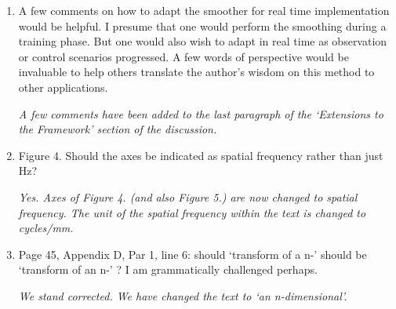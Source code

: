 \documentclass{article}
\begin{document}
\begin{enumerate}
\item A few comments on how to adapt the smoother for real time implementation would be helpful. I presume that one would perform the smoothing during a training phase. But one would also wish to adapt in real time as observation or control scenarios progressed. A few words of perspective would be invaluable to help others translate the author's wisdom on this method to other applications.

\emph{A few comments have been added to the last paragraph of the `Extensions to the Framework' section of the discussion.}

\item Figure 4. Should the axes be indicated as spatial frequency rather than just Hz?

\emph{Yes. Axes of Figure 4. (and also Figure 5.) are now changed to spatial frequency. The unit of the spatial frequency within the text is changed to cycles/mm.}

\item Page 45, Appendix D, Par 1, line 6: should `transform of a n-' should be `transform of an n-' ? I am grammatically challenged perhaps.

\emph{We stand corrected. We have changed the text to `an n-dimensional'.}

\end{enumerate}
\end{document}
